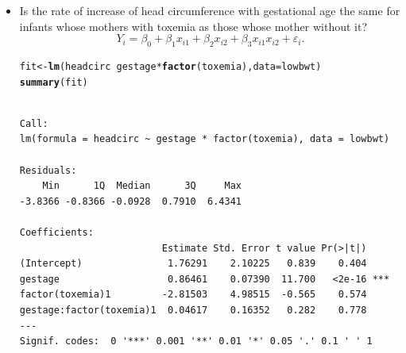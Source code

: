 \documentclass{article}\usepackage[]{graphicx}\usepackage[svgnames]{xcolor}
\makeatletter
\newcommand{\hlopt}[1]{\textcolor[rgb]{0,0,0}{#1}}%
\newcommand{\hlstd}[1]{\textcolor[rgb]{0.345,0.345,0.345}{#1}}%
\newcommand{\hlkwb}[1]{\textcolor[rgb]{0.69,0.353,0.396}{#1}}%
\newcommand{\hlkwc}[1]{\textcolor[rgb]{0.333,0.667,0.333}{#1}}%
\newcommand{\hlkwd}[1]{\textcolor[rgb]{0.737,0.353,0.396}{\textbf{#1}}}%
\newenvironment{kframe}{%
 \def\at@end@of@kframe{}%
 \ifinner\ifhmode%
  \def\at@end@of@kframe{\end{minipage}}%
  \begin{minipage}{\columnwidth}%
 \fi\fi%
 \def\FrameCommand##1{\hskip\@totalleftmargin \hskip-\fboxsep
 \colorbox{shadecolor}{##1}\hskip-\fboxsep
     \hskip-\linewidth \hskip-\@totalleftmargin \hskip\columnwidth}%
 \MakeFramed {\advance\hsize-\width
   \@totalleftmargin\z@ \linewidth\hsize
   \@setminipage}}%
 {\par\unskip\endMakeFramed%
 \at@end@of@kframe}
\newenvironment{knitrout}{}{} %
\newcommand{\HN}{\textsl{H}_{\textsl{0}}}%
\makeatother
\begin{document}
\begin{itemize}
\begin{knitrout}
\begin{kframe}
\begin{verbatim}
Call:
lm(formula = headcirc ~ gestage + factor(toxemia), data = lowbwt)

Residuals:
    Min      1Q  Median      3Q     Max 
-3.8427 -0.8427 -0.0525  0.8109  6.4092 

Coefficients:
                 Estimate Std. Error t value Pr(>|t|)    
(Intercept)       1.49558    1.86799   0.801  0.42530    
gestage           0.87404    0.06561  13.322  < 2e-16 ***
factor(toxemia)1 -1.41233    0.40615  -3.477  0.00076 ***
---
Signif. codes:  0 '***' 0.001 '**' 0.01 '*' 0.05 '.' 0.1 ' ' 1

Residual standard error: 1.507 on 97 degrees of freedom
Multiple R-squared:  0.6528,	Adjusted R-squared:  0.6456 
F-statistic: 91.18 on 2 and 97 DF,  p-value: < 2.2e-16
\end{verbatim}
\end{kframe}
\end{knitrout}
            What is the interpretation of $ \beta_2 $?

            $ \hat{\beta}_3=-1.41233 $. After adjustment of gestational age, the babies whose mothers had toxemia have smaller (by \qty{1.41}{\cm}) than
            those whose mothers did not. This difference is significant (test $ \HN $: $ \beta_2=0 $, $ p\text{-value}=0.0076<0.05$).
      \item Is the rate of increase of head circumference with gestational age the same
            for infants whose mothers with toxemia as those whose mother without it?
            \[ Y_i=\beta_0+\beta_1x_{i1}+\beta_2x_{i2}+\beta_3x_{i1}x_{i2}+\varepsilon_i. \]
\begin{knitrout}
\color{fgcolor}\begin{kframe}
\begin{alltt}
\hlstd{fit} \hlkwb{<-} \hlkwd{lm}\hlstd{(headcirc} \hlopt{~} \hlstd{gestage} \hlopt{*} \hlkwd{factor}\hlstd{(toxemia),} \hlkwc{data} \hlstd{= lowbwt)}
\hlkwd{summary}\hlstd{(fit)}
\end{alltt}
\begin{verbatim}

Call:
lm(formula = headcirc ~ gestage * factor(toxemia), data = lowbwt)

Residuals:
    Min      1Q  Median      3Q     Max 
-3.8366 -0.8366 -0.0928  0.7910  6.4341 

Coefficients:
                         Estimate Std. Error t value Pr(>|t|)    
(Intercept)               1.76291    2.10225   0.839    0.404    
gestage                   0.86461    0.07390  11.700   <2e-16 ***
factor(toxemia)1         -2.81503    4.98515  -0.565    0.574    
gestage:factor(toxemia)1  0.04617    0.16352   0.282    0.778    
---
Signif. codes:  0 '***' 0.001 '**' 0.01 '*' 0.05 '.' 0.1 ' ' 1


\end{verbatim}
\end{kframe}
\end{knitrout}
\end{itemize}
\end{document}
